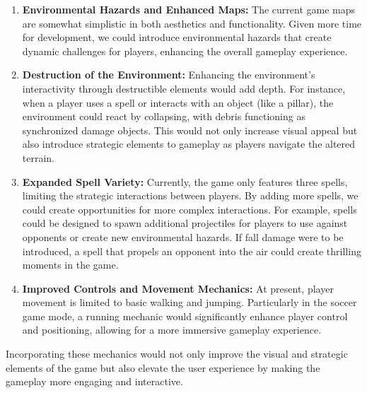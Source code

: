 \documentclass[conference]{IEEEtran}
\begin{document}
    \begin{enumerate}
        \item \textbf{Environmental Hazards and Enhanced Maps:} The current game maps are somewhat simplistic in both aesthetics and functionality.
        Given more time for development, we could introduce environmental hazards that create dynamic challenges for players, enhancing the overall gameplay experience.

        \item \textbf{Destruction of the Environment:} Enhancing the environment's interactivity through destructible elements would add depth.
        For instance, when a player uses a spell or interacts with an object (like a pillar), the environment could react by collapsing, with debris functioning as synchronized damage objects.
        This would not only increase visual appeal but also introduce strategic elements to gameplay as players navigate the altered terrain.

        \item \textbf{Expanded Spell Variety:} Currently, the game only features three spells, limiting the strategic interactions between players.
        By adding more spells, we could create opportunities for more complex interactions.
        For example, spells could be designed to spawn additional projectiles for players to use against opponents or create new environmental hazards.
        If fall damage were to be introduced, a spell that propels an opponent into the air could create thrilling moments in the game.

        \item \textbf{Improved Controls and Movement Mechanics:} At present, player movement is limited to basic walking and jumping.
        Particularly in the soccer game mode, a running mechanic would significantly enhance player control and positioning, allowing for a more immersive gameplay experience.
    \end{enumerate}

    Incorporating these mechanics would not only improve the visual and strategic elements of the game but also elevate the user experience by making the gameplay more engaging and interactive.
\end{document}
